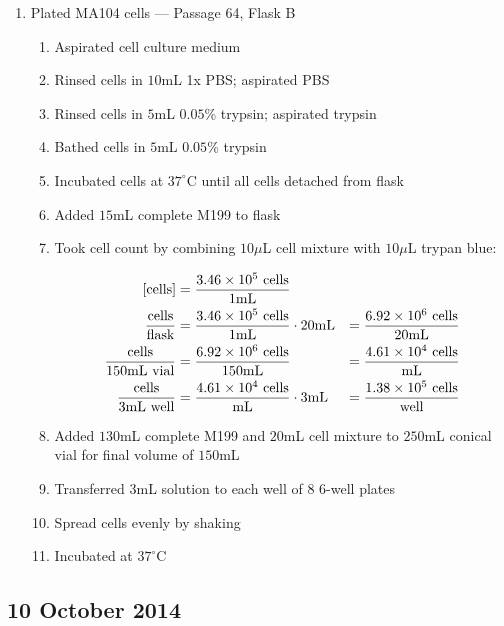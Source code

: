 \begin{enumerate}
	\item Plated MA104 cells --- Passage 64, Flask B
		\begin{enumerate}
			\item Aspirated cell culture medium
			\item Rinsed cells in $10$mL 1x PBS; aspirated PBS
			\item Rinsed cells in $5$mL $0.05$\% trypsin; aspirated trypsin
			\item Bathed cells in $5$mL $0.05$\% trypsin
			\item Incubated cells at $37^{\circ}$C until all cells detached from flask
			\item Added $15$mL complete M199 to flask\
			\item Took cell count by combining $10\mu$L cell mixture with $10\mu$L trypan blue:
			
				\begin{align*}
				\text{[cells]} &= \frac{3.46\times 10^{5}\text{ cells}}{1\text{mL}} \\
				\frac{\text{cells}}{\text{flask}} &= \frac{3.46\times 10^{5}\text{ cells}}{1\text{mL}} \cdot 20\text{mL} &= \frac{6.92\times 10^{6}\text{ cells}}{20\text{mL}}\\
				\frac{\text{cells}}{150\text{mL vial}} &= \frac{6.92\times 10^{6}\text{ cells}}{150\text{mL}} &= \frac{4.61\times 10^{4}\text{ cells}}{\text{mL}}\\
				\frac{\text{cells}}{3\text{mL well}} &= \frac{4.61\times 10^{4}\text{ cells}}{\text{mL}} \cdot 3\text{mL} &= \frac{1.38\times 10^{5}\text{ cells}}{\text{well}}\\
				\end{align*}
			\item Added $130$mL complete M199 and $20$mL cell mixture to $250$mL conical vial for final volume of $150$mL
			\item Transferred $3$mL solution to each well of 8 6-well plates
			\item Spread cells evenly by shaking
			\item Incubated at $37^{\circ}$C
		\end{enumerate}

\end{enumerate}

%

\subsection*{10 October 2014}

